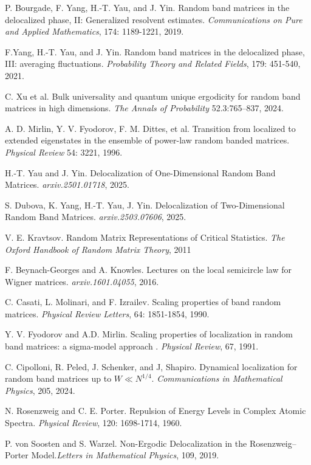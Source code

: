 \documentclass[11pt]{article}
\begin{document}
\begin{thebibliography}{99}
 P. Bourgade, F. Yang, H.-T. Yau, and J. Yin. Random band matrices in the delocalized phase, II: Generalized resolvent estimates. \textit{Communications on Pure and Applied Mathematics}, 174: 1189-1221, 2019.


 F.Yang, H.-T. Yau, and J. Yin. Random band matrices in the delocalized phase, III: averaging fluctuations. \textit{Probability Theory and Related Fields}, 179: 451-540, 2021.

 C. Xu et al. Bulk universality and quantum unique ergodicity for random band matrices in high dimensions. \textit{The Annals of Probability} 52.3:765–837, 2024.


 A. D. Mirlin, Y. V. Fyodorov, F. M. Dittes, et al. Transition from localized to extended eigenstates in the ensemble
of power-law random banded matrices.\textit{ Physical Review} 54: 3221, 1996.

 H.-T. Yau and J. Yin. Delocalization of One-Dimensional Random Band Matrices. \textit{arxiv.2501.01718}, 2025.

 S. Dubova, K. Yang, H.-T. Yau, J. Yin. Delocalization of Two-Dimensional Random Band Matrices. \textit{arxiv.2503.07606}, 2025. 

  V. E. Kravtsov. Random Matrix Representations of Critical Statistics. \textit{The Oxford Handbook of Random Matrix Theory}, 2011


 F. Beynach-Georges and A. Knowles. Lectures on the local semicircle law for Wigner matrices. \textit{arxiv.1601.04055}, 2016.

 C. Casati, L. Molinari, and F. Izrailev. Scaling properties of band random matrices. \textit{Physical Review Letters}, 64: 1851-1854, 1990.

 Y. V. Fyodorov and A.D. Mirlin. Scaling properties of localization in random band matrices: a sigma-model approach . \textit{Physical Review}, 67, 1991.

 C. Cipolloni, R. Peled, J. Schenker, and J, Shapiro. Dynamical localization for random band matrices up to {$W\ll N^{1/4}$}. \textit{Communications in Mathematical Physics}, 205, 2024. 

  N. Rosenzweig and C. E. Porter. Repulsion of Energy Levels in Complex Atomic Spectra. \textit{Physical Review}, 120: 1698-1714, 1960.

 P. von Soosten and S. Warzel. Non-Ergodic Delocalization in the Rosenzweig–Porter Model.\textit{Letters in Mathematical Physics}, 109, 2019.


\end{thebibliography}
\end{document}
